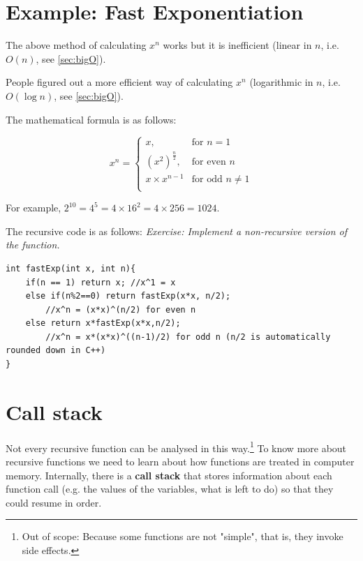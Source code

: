 \section{Example: Fast Exponentiation}

The above method of calculating $x^n$ works but it is inefficient (linear in $n$, i.e. $O(n)$, see \cref{sec:bigO}). 

People figured out a more efficient way of calculating $x^n$ (logarithmic in $n$, i.e. $O(\log n)$, see \cref{sec:bigO}). 

The mathematical formula is as follows:

\[
    x^n = \begin{cases}
    x, & \text{for } n = 1 \\
    (x^2)^{\frac{n}{2}}, & \text{for even } n \\
    x \times x^{n-1} & \text{for odd } n \neq 1\\
    \end{cases}
\]




For example, $2^{10} = 4^5 = 4\times 16^2 = 4\times 256 = 1024$.

The recursive code is as follows: \textit{Exercise: Implement a non-recursive version of the function.}

\begin{lstlisting}
int fastExp(int x, int n){
    if(n == 1) return x; //x^1 = x
    else if(n%2==0) return fastExp(x*x, n/2); 
        //x^n = (x*x)^(n/2) for even n
    else return x*fastExp(x*x,n/2); 
        //x^n = x*(x*x)^((n-1)/2) for odd n (n/2 is automatically rounded down in C++)
}
\end{lstlisting}

\newpage

\section{Call stack}

Not every recursive function can be analysed in this way.\footnote{Out of scope: Because some functions are not "simple", that is, they invoke side effects.} To know more about recursive functions we need to learn about how functions are treated in computer memory. Internally, there is a \textbf{call stack} that stores information about each function call (e.g. the values of the variables, what is left to do) so that they could resume in order.

